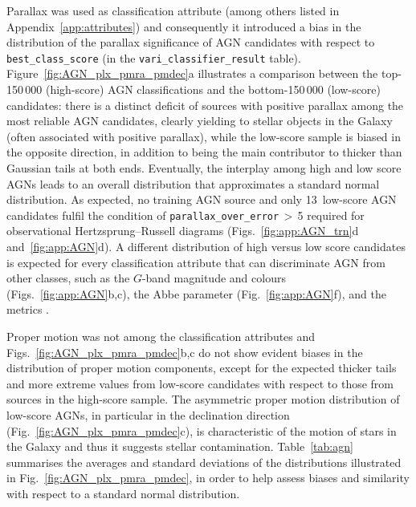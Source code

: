 \documentclass[longauth]{aa}
\def\g{$G$\xspace}
\begin{document}
Parallax was used as classification attribute  (among others listed in Appendix~\ref{app:attributes}) and consequently it introduced a bias in the distribution of the parallax significance of AGN candidates with respect to \texttt{best\_class\_score} (in the \texttt{vari\_classifier\_result} table). Figure~\ref{fig:AGN_plx_pmra_pmdec}a illustrates a comparison between the top-150\,000 (high-score) AGN classifications and the bottom-150\,000 (low-score) candidates: there is a distinct deficit of sources with positive parallax among the most reliable AGN candidates, clearly yielding to stellar objects in the Galaxy (often associated with positive parallax), while the low-score sample is biased in the opposite direction, in addition to being the main contributor to thicker than Gaussian tails at both ends.
Eventually, the interplay among high and low score AGNs leads to an overall distribution that approximates a standard normal distribution.
As expected, no training AGN source and only 13~low-score AGN candidates fulfil the condition of \texttt{parallax\_over\_error}\,$>$\,5 required for  observational Hertzsprung--Russell diagrams (Figs.~\ref{fig:app:AGN_trn}d and~\ref{fig:app:AGN}d).
A different distribution of high versus low score candidates is expected for every classification attribute that can discriminate AGN from other classes, such as the \g-band magnitude and colours (Figs.~\ref{fig:app:AGN}b,c), the Abbe parameter (Fig.~\ref{fig:app:AGN}f), and the \citet{2011AJ....141...93B} metrics \citep{DR3-DPACP-167}.

Proper motion was not among the classification attributes and Figs.~\ref{fig:AGN_plx_pmra_pmdec}b,c do not show evident biases in the distribution of proper motion components, except for the expected thicker tails and more extreme values from low-score candidates with respect to those from sources in the high-score sample.
The asymmetric proper motion distribution of low-score AGNs, in particular in the declination direction (Fig.~\ref{fig:AGN_plx_pmra_pmdec}c), is characteristic of the motion of stars in the Galaxy \cite[see fig.~D.3 in][]{EDR3-DPACP-133} and thus it suggests stellar contamination.
Table~\ref{tab:agn} summarises the averages and standard deviations of the distributions illustrated in Fig.~\ref{fig:AGN_plx_pmra_pmdec}, in order to help assess biases and similarity with respect to a standard normal distribution.
\end{document}
